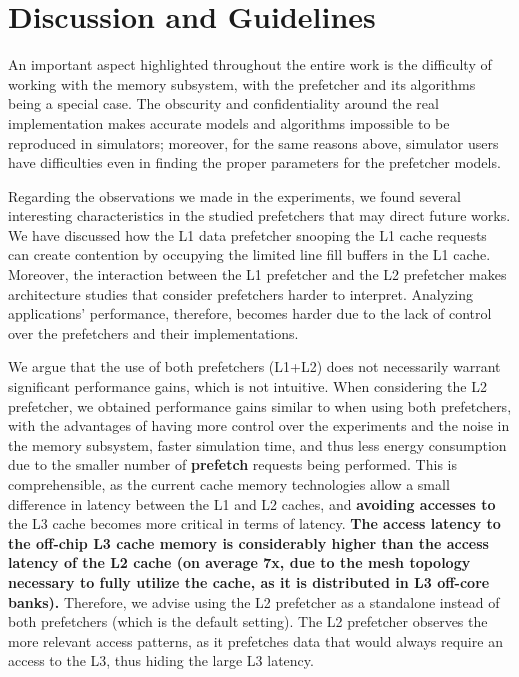 \documentclass[AMA,final,STIX1COL]{WileyNJD-v2}
\newcommand\new[1]{{\color{red}\textbf{#1}}}
\begin{document}
\section{Discussion and Guidelines}\label{sec:insights}

An important aspect highlighted throughout the entire work is the difficulty of working with the memory subsystem, with the prefetcher and its algorithms being a special case.
The obscurity and confidentiality around the real implementation makes accurate models and algorithms impossible to be reproduced in simulators; moreover, for the same reasons above, simulator users have difficulties even in finding the proper parameters for the prefetcher models.


Regarding the observations we made in the experiments, we found several interesting characteristics in the studied prefetchers that may direct future works.
We have discussed how the L1 data prefetcher snooping the L1 cache requests can create contention by occupying the limited line fill buffers in the L1 cache.
Moreover, the interaction between the L1 prefetcher and the L2 prefetcher makes architecture studies that consider prefetchers harder to interpret.
Analyzing applications' performance, therefore, becomes harder due to the lack of control over the prefetchers and their implementations.

We argue that the use of both prefetchers (L1+L2) does not necessarily warrant significant performance gains, which is not intuitive.
When considering the L2 prefetcher, we obtained performance gains similar to when using both prefetchers, with the advantages of having more control over the experiments and the noise in the memory subsystem, faster simulation time, and thus less energy consumption due to the smaller number of \new{prefetch} requests being performed. 
This is comprehensible, as the current cache memory technologies allow a small difference in latency between the L1 and L2 caches, and \new{avoiding accesses to} the L3 cache becomes more critical in terms of latency.
\new{The access latency to the off-chip L3 cache memory is considerably higher than the access latency of the L2 cache (on average 7x, due to the mesh topology necessary to fully utilize the cache, as it is distributed in L3 off-core banks).}
Therefore, we advise using the L2 prefetcher as a standalone instead of both prefetchers (which is the default setting).
The L2 prefetcher observes the more relevant access patterns, as it prefetches data that would always require an access to the L3, thus hiding the large L3 latency.
\end{document}
